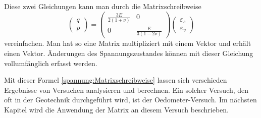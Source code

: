 Diese zwei Gleichungen kann man durch die Matrixschreibweise
\begin{equation}
\begin{pmatrix}
	q\\
	p
\end{pmatrix}
=
\begin{pmatrix}
	\frac{3E}{2(1+\nu)} &                   0 \\
	                  0 & \frac{E}{3(1-2\nu)}
\end{pmatrix}
\begin{pmatrix}
	\varepsilon_{s}\\
	\varepsilon_{v}
\end{pmatrix}
\label{spannung:Matrixschreibweise}
\end{equation}
vereinfachen.
Man hat so eine Matrix multipliziert mit einem Vektor und erhält einen Vektor.
Änderungen des Spannungszustandes können mit dieser Gleichung vollumfänglich erfasst werden.

Mit dieser Formel \eqref{spannung:Matrixschreibweise} lassen sich verschieden Ergebnisse von Versuchen analysieren und berechnen.
Ein solcher Versuch, den oft in der Geotechnik durchgeführt wird, ist der Oedometer-Versuch.
Im nächsten Kapitel wird die Anwendung der Matrix an diesem Versuch beschrieben.
